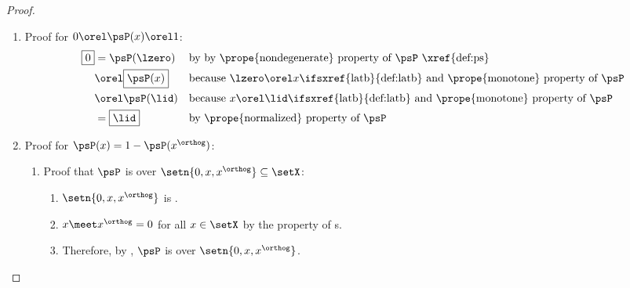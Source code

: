 \begin{proof}
  \begin{enumerate}
    \item Proof for $0\orel\psP(x)\orel 1$:
      \begin{align*}
        \boxed{0}
          &= \psP(\lzero)
          && \text{by by \prope{nondegenerate} property of $\psP$ \xref{def:ps}}
        \\&\orel \boxed{\psP(x)}
          && \text{because $\lzero\orel x$\ifsxref{latb}{def:latb} and \prope{monotone} property of $\psP$}
        \\&\orel \psP(\lid)
          && \text{because $x\orel\lid$\ifsxref{latb}{def:latb} and \prope{monotone} property of $\psP$}
        \\&= \boxed{\lid}
          && \text{by \prope{normalized} property of $\psP$}
      \end{align*}
    \item Proof for $\psP(x)=1-\psP({x^\orthog})$:
      \begin{enumerate}
        \item Proof that $\psP$ is   over $\setn{0,x,x^\orthog}\subseteq\setX$: \label{item:ps_additive}
          \begin{enumerate}
            \item $\setn{0,x,x^\orthog}$ is .
            \item $x\meet x^\orthog=0$ for all $x\in\setX$ by the  property of 
                  s.
            \item Therefore, by , $\psP$ is  over $\setn{0,x,x^\orthog}$.
          \end{enumerate}
      

\end{enumerate}
\end{enumerate}
\end{proof}
